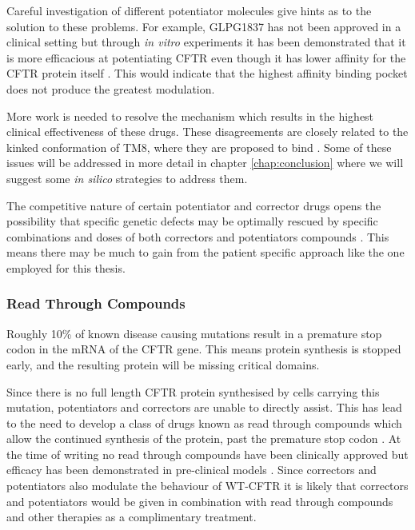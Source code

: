 Careful investigation of different potentiator molecules give hints as to the solution to these problems. For example, GLPG1837 has not been approved in a clinical setting but through \textit {in vitro} experiments it has been demonstrated that it is more efficacious at potentiating CFTR even though it has lower affinity for the CFTR protein itself \cite{vanderplas2018}. This would indicate that the highest affinity binding pocket does not produce the greatest modulation. 

More work is needed to resolve the mechanism which results in the highest clinical effectiveness of these drugs. These disagreements are closely related to the kinked conformation of TM8, where they are proposed to bind \cite{liu2019, yeh2019}. Some of these issues will be addressed in more detail in chapter \ref{chap:conclusion} where we will suggest some \textit{in silico} strategies to address them. 

The competitive nature of certain potentiator and corrector drugs opens the possibility that specific genetic defects may be optimally rescued by specific combinations and doses of both correctors and potentiators compounds \cite{csanady2019}. This means there may be much to gain from the patient specific approach like the one employed for this thesis. 

\subsubsection{Read Through Compounds}
Roughly 10\% of known disease causing mutations result in a premature stop codon in the mRNA of the CFTR gene. This means protein synthesis is stopped early, and the resulting protein will be missing critical domains. 

Since there is no full length CFTR protein synthesised by cells carrying this mutation, potentiators and correctors are unable to directly assist. This has lead to the need to develop a class of drugs known as read through compounds which allow the continued synthesis of the protein, past the premature stop codon \cite{sharma2021}. At the time of writing no read through compounds have been clinically approved but efficacy has been demonstrated in pre-clinical models \cite{crawford2021}. Since correctors and potentiators also modulate the behaviour of WT-CFTR it is likely that correctors and potentiators would be given in combination with read through compounds and other therapies as a complimentary treatment.

